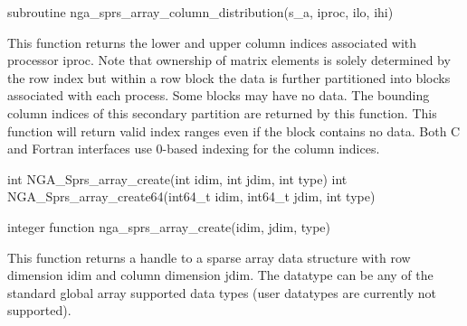 \documentclass[12pt]{article}
\begin{document}
\begin{fapi}
\begin{fcode}
subroutine nga_sprs_array_column_distribution(s_a, iproc, ilo, ihi)
\end{fcode}
\end{fapi}

\local

\begin{desc}
This function returns the lower and upper column indices associated with
processor iproc. Note
that ownership of matrix elements is solely determined by the row index but
within a row block the data is further partitioned into blocks associated with
each process. Some blocks may have no data. The bounding column indices of this
secondary partition are returned by this function.  This function will return
valid index ranges even if the block contains no data.  Both C and Fortran
interfaces use 0-based indexing for the column indices.
\end{desc}


\begin{capi}
\begin{ccode}
int NGA_Sprs_array_create(int idim, int jdim, int type)
int NGA_Sprs_array_create64(int64_t idim, int64_t jdim, int type)
\end{ccode}
\begin{funcargs}
\end{funcargs}
\end{capi}

\begin{fapi}
\begin{fcode}
integer function nga_sprs_array_create(idim, jdim, type)
\end{fcode}
\begin{funcargs}
\end{funcargs}
\end{fapi}

\gcoll

\begin{desc}
This function returns a handle to a sparse array data structure with row
dimension idim and column dimension jdim. The datatype can be any of the
standard global array supported data types (user datatypes are currently not
supported).
\end{desc}
\end{document}
